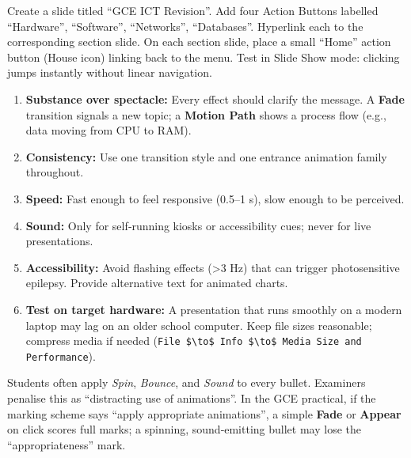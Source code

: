 \documentclass[11pt]{article}
\newcounter{popsec}
\newcounter{popsub}
\newcommand{\courssub}[1]{%
  \stepcounter{popsub}%
  \par\vspace{9pt}\noindent{\popxbold\fontsize{11.5}{13}\selectfont\color{popink}{\color{poporange}\thepopsec.\thepopsub}\hspace{6pt}#1}\par\nopagebreak\vspace{4pt}
}
\begin{document}
\begin{experience}
Create a slide titled “GCE ICT Revision”. Add four Action Buttons labelled “Hardware”, “Software”, “Networks”, “Databases”. Hyperlink each to the corresponding section slide. On each section slide, place a small “Home” action button (House icon) linking back to the menu. Test in Slide Show mode: clicking jumps instantly without linear navigation.
\end{experience}

\courssub{Good Practice and Exam Tips}

\begin{aretenir}
\begin{enumerate}
\item \textbf{Substance over spectacle:} Every effect should clarify the message. A \textbf{Fade} transition signals a new topic; a \textbf{Motion Path} shows a process flow (e.g., data moving from CPU to RAM).
\item \textbf{Consistency:} Use one transition style and one entrance animation family throughout.
\item \textbf{Speed:} Fast enough to feel responsive (0.5–1 s), slow enough to be perceived.
\item \textbf{Sound:} Only for self‑running kiosks or accessibility cues; never for live presentations.
\item \textbf{Accessibility:} Avoid flashing effects (>3 Hz) that can trigger photosensitive epilepsy. Provide alternative text for animated charts.
\item \textbf{Test on target hardware:} A presentation that runs smoothly on a modern laptop may lag on an older school computer. Keep file sizes reasonable; compress media if needed (\texttt{File \$\textbackslash{}to\$ Info \$\textbackslash{}to\$ Media Size and Performance}).
\end{enumerate}
\end{aretenir}

\begin{attention}
Students often apply \emph{Spin}, \emph{Bounce}, and \emph{Sound} to every bullet. Examiners penalise this as “distracting use of animations”. In the GCE practical, if the marking scheme says “apply appropriate animations”, a simple \textbf{Fade} or \textbf{Appear} on click scores full marks; a spinning, sound‑emitting bullet may lose the “appropriateness” mark.
\end{attention}
\end{document}
